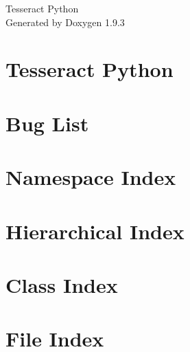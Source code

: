 \documentclass[twoside]{book}
\newcommand{\+}{\discretionary{\mbox{\scriptsize$\hookleftarrow$}}{}{}}
\newcommand{\clearemptydoublepage}{%
    \newpage{\pagestyle{empty}\cleardoublepage}%
  }
\begin{document}
  \raggedbottom
    \hypersetup{pageanchor=false,
                bookmarksnumbered=true,
                pdfencoding=unicode
               }
  \begin{titlepage}
  \vspace*{7cm}
  \begin{center}%
  {\Large Tesseract Python}\\
  \vspace*{1cm}
  {\large Generated by Doxygen 1.9.3}\\
  \end{center}
  \end{titlepage}
  \clearemptydoublepage
  \tableofcontents
  \clearemptydoublepage
  \hypersetup{pageanchor=true}
\chapter{Tesseract Python}
\label{index}\hypertarget{index}{}
\chapter{Bug List}
\label{bug}

\chapter{Namespace Index}

\chapter{Hierarchical Index}

\chapter{Class Index}

\chapter{File Index}

\end{document}
